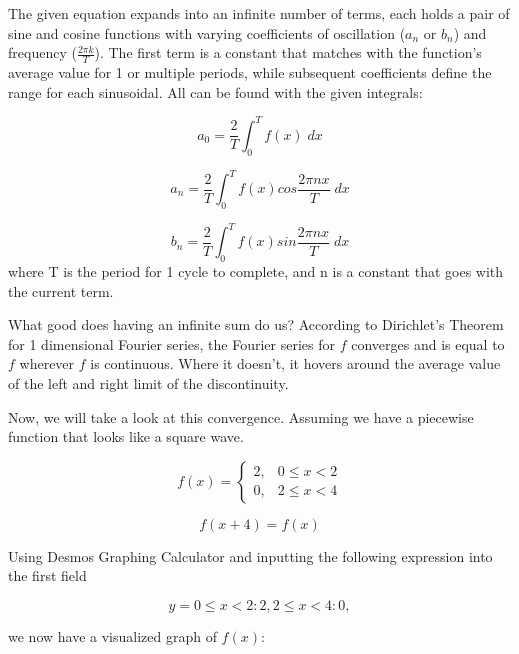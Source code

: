 \documentclass[a4paper]{article}
\begin{document}
	The given equation expands into an infinite number of terms, each holds a pair of sine and cosine functions with varying coefficients of oscillation ($a_n$ or $b_n$) and frequency ($\frac{2\pi k}{T}$). The first term is a constant that matches with the function's average value for 1 or multiple periods, while subsequent coefficients define the range for each sinusoidal. All can be found with the given integrals:
	
	\begin{equation*}
	a_0 = \frac{2}{T} \int_{0}^{T}f(x)\;dx
	\end{equation*}
	
	\begin{equation*}
	a_n = \frac{2}{T} \int_{0}^{T}f(x)cos\frac{2\pi nx}{T}\;dx
	\end{equation*}
	
	\begin{equation*}
	b_n = \frac{2}{T} \int_{0}^{T}f(x)sin\frac{2\pi nx}{T}\;dx
	\end{equation*}
	where T is the period for 1 cycle to complete, and n is a constant that goes with the current term.
	
	What good does having an infinite sum do us? According to Dirichlet's Theorem for 1 dimensional Fourier series, the Fourier series for $f$ converges and is equal to $f$ wherever $f$ is continuous. Where it doesn't, it hovers around the average value of the left and right limit of the discontinuity.
	
	Now, we will take a look at this convergence. Assuming we have a piecewise function that looks like a square wave.
	
	\begin{equation*}
	f(x) = \begin{cases} 2, & 0 \leq x < 2 \\ 0, & 2 \leq x < 4 \end{cases}
	\end{equation*}
	
	\begin{equation*}
	f(x+4) = f(x)
	\end{equation*}
	
	Using Desmos Graphing Calculator and inputting the following expression into the first field
	
	\begin{equation*}
	y = {0\leq x<2:2,2\leq x<4:0},
	\end{equation*}
	
	we now have a visualized graph of $f(x)$:
	
\end{document}

